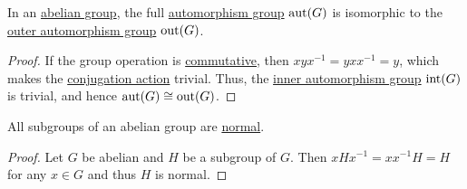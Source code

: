 \begin{proposition}\label{thm:abelian_outer_automorphism_group}
  In an \hyperref[def:abelian_group]{abelian group}, the full \hyperref[def:automorphism_group]{automorphism group} \( \operatorname{aut}(G) \) is isomorphic to the \hyperref[def:inner_and_outer_automorphisms]{outer automorphism group} \( \operatorname{out}(G) \).
\end{proposition}
\begin{proof}
  If the group operation is \hyperref[def:magma/commutative]{commutative}, then \( xyx^{-1} = yxx^{-1} = y \), which makes the \hyperref[def:inner_and_outer_automorphisms]{conjugation action} trivial. Thus, the \hyperref[def:inner_and_outer_automorphisms]{inner automorphism group} \( \operatorname{int}(G) \) is trivial, and hence \( \operatorname{aut}(G) \cong \operatorname{out}(G) \).
\end{proof}

\begin{proposition}\label{thm:abelian_normal_subgroups}
  All subgroups of an abelian group are \hyperref[thm:normal_subgroup_equivalences]{normal}.
\end{proposition}
\begin{proof}
  Let \( G \) be abelian and \( H \) be a subgroup of \( G \). Then \( x H x^{-1} = xx^{-1} H = H \) for any \( x \in G \) and thus \( H \) is normal.
\end{proof}

